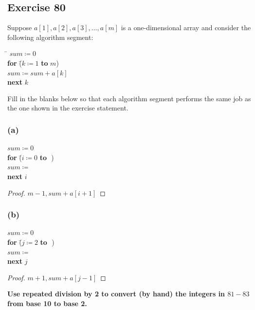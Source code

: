 \documentclass[14pt]{extarticle}
\newcommand{\fbl}{\underline{\hspace{1cm}}\,\,}
\newcommand{\cy}{\color{cyan}}
\begin{document}
\subsection{Exercise 80}
Suppose $a[1], a[2], a[3], \ldots, a[m]$ is a one-dimensional array and consider the following algorithm segment:

\begin{tabbing}
\hspace{7cm}
\= $sum \coloneqq 0$ \\
\> {\bf for} \= ($k \coloneqq 1$ {\bf to} $m$) \\
\>           \> $sum \coloneqq sum +  a[k]$ \\
\> {\bf next} $k$
\end{tabbing}

Fill in the blanks below so that each algorithm segment performs the same job as the one shown in the exercise statement.

\subsubsection{(a)}
\begin{tabbing}
$sum \coloneqq 0$ \\
{\bf for} \= ($i \coloneqq 0$ {\bf to} \fbl) \\
          \> $sum \coloneqq$ \fbl \\
{\bf next} $i$
\end{tabbing}

\begin{proof}
$m - 1, sum + a[i + 1]$
\end{proof}

\subsubsection{(b)}
\begin{tabbing}
$sum \coloneqq 0$ \\
{\bf for} \= ($j \coloneqq 2$ {\bf to} \fbl) \\
          \> $sum \coloneqq$ \fbl \\
{\bf next} $j$
\end{tabbing}

\begin{proof}
$m + 1, sum + a[j - 1]$
\end{proof}

{\bf\cy Use repeated division by 2 to convert (by hand) the integers in $81-83$ from base 10 to base 2.}
\end{document}
